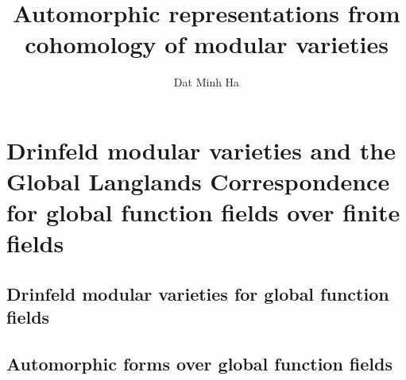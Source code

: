

\setcounter{section}{-1}





	\title{Automorphic representations from cohomology of modular varieties}
	
	\author{Dat Minh Ha}
	\maketitle
	
	\begin{abstract}
	    
	\end{abstract}
	
	{
      \hypersetup{} 
      \dominitoc
      \tableofcontents %
    }
    
    \part{Drinfeld modular varieties and the Global Langlands Correspondence for global function fields over finite fields}
        \chapter{Drinfeld modular varieties for global function fields}
            \begin{abstract}
                
            \end{abstract}
            
            \minitoc
            
            
            
            
            
            
            
            
            
        \chapter{Automorphic forms over global function fields}
            
        
